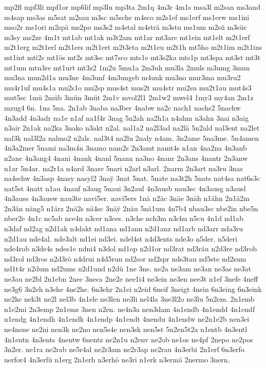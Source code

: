 {mp2fl
mpf3li
mpf1or
mp6lif
mp3lu
mp3ta
2m1q
4m3r
4m1s
msa3l
m2san
ms3and
m4sap
ms3as
m5sat
m2sau
m3sc
m5sche
m4sco
m2s1ef
ms1erf
ms1erw
ms1ini
mso2r
ms1ori
m2spä
ms2po
ms3s2
m4stal
m4strä
m3stu
ms1um
m2sü
m3süc
m3sy
ms2ze
4m1t
mt1ab
mt1ak
m3t2am
mt1ar
mt3are
mt1ein
mt1elt
m2t1erf
m2t1erg
m2t1erl
m2t1ers
m2t1ert
m2t3eta
m2t1eu
m2t1h
mt5ho
m2t1im
m2t1ins
mt1int
mti2s
mt1ös
mt2s
mt3sc
mt7sco
mts1e
mt3s2ka
mts1p
mt3spa
mt3st
mt3t
mt1um
mtu3re
mt1urt
mt3z2
1m2u
5mu1a
2m3uh
mu3la
2muls
m3umg
3mun
mu3na
mun2d1a
mu3ne
4m3unf
4m3ungeb
m4unk
mu3no
mur3ma
mu3ru2
mu4r1uf
mu4s1a
mu2s1o
mu2sp
mus4st
mus2t
mu4str
mu2su
mu2t1au
mut4s3
mut5sc
1mü
2müb
3mün
3müt
2m1v
mvol2l1
2m1w2
mwel4
1my3
my4an
2m1z
mzug4
6n.
1na
5na.
2n1ab
3naba
na3ber
4nabw
na2c
nach1
nachs2
5nachw
4n3add
4n3adr
na1e
n1af
na1f4r
3nag
5n2ah
na2h1a
n4ahm
n3ahn
3nai
n3aig
n3air
2n1ak
na2ka
3nako
n3akt
n2al.
nal1a2
na2l3ad
na2lä
5n2ald
nal3ent
na2let
nal3k
nal3l2a
nalmo2
n2als.
nal3t4
na2lu
2naly
n4am.
3n2ame
5na3me.
5n4amen
4n3a2mer
5nami
na3m4n
3namo
nam2s
2n3amt
namt4s
n1an
4na2na
4n3anb
n2anc
4n3ang4
4nani
4nank
4nanl
5nann
na3no
4nanr
2n3ans
4nantr
2n3anw
n1ar
5n4ar.
na2r1a
n4ard
3nare
5nari
n2arl
n3arl.
2narm
2n3art
na3ru
3nas
na4schw
4n3asp
4nasy
nasyl2
3na^^ff
3nat
5nat.
5nate
na3t2h
5nats
nat4sa
nat6s3c
nat5st
4natt
n1au
4nauf
n3aug
5naui
3n2aul
4n3ausb
nau3sc
4n3ausg
n3ausl
4n3auss
4n3ausw
nau3te
navi5er.
navi5ers
1nä
n2äc
3näe
3näh
n1ähn
2n1ä2m
2n3än
näng5
n1ärz
2nä2s
nä4sc
3nä^^ff
2näu
5nä1um
4n7b4
nbau3sc
nbe2in
nbe5n
nber2e
4n1c
nc5ab
nce4n
n3cer
n3ces.
n3che
nch3m
n3chu
n5cu
4n1d
nd1ab
n3daf
nd2ag
n2d1ak
n4dakt
nd1ana
nd1ann
n2d1anz
nd1arb
nd3arr
nda3ru
n2d1au
nde4al.
nde3alt
nd1ei
nd3ei.
ndel4st
n4d3ents
nde3o
n5der.
n5deri
nde4rob
n3de4s
ndes1e
ndni4
n3dol
nd1op
n2d1or
nd3rat
nd3räu
n2d3re
nd3rob
nd3rol
nd3ros
n2d3rö
n4drui
n4d5run
nd2sor
nd2spr
nds3tau
nd5ste
nd2sum
nd1t4r
n2dum
nd2ums
n2d1und
n2dü
1ne
3ne.
ne2a
ne3am
ne3an
ne3as
ne3at
ne3au
ne2bl
2n1ebn
2nec
3neca
2ne2e
nee1i4
ne3ein
ne3en
nee3t
n1ef
3nefe
4neff
ne3g6
3n2eh
n3ehe
4ne2he.
6n3ehr
2n1ei
n2eid
6neif
3neigt
4nein
6n3eing
6n3eink
ne2ke
nek3t
ne2l
nel3b
4n1ele
ne3len
ne3li
nel4la
3ne3l2o
ne3lu
5n2em.
2n1emb
n1e2mi
2n3emp
2n1ems
3nen
n2en.
ne4n3a
nen3dam
4n1endb
4n1endd
4n1endf
n1endg
4n1endh
4n1endk
4n1endp
4n1endt
4nendu
4n1endw
ne2n1e2b
nen3ei
ne4nene
ne2ni
nen3k
ne2no
nen5s4e
nen3sk
nen5st
5n2en5t2a
n1entb
4n3entl
4n1entn
4n3ents
4nentw
6nentz
ne2n1u
n2env
ne2ob
ne1os
ne4pf
2nepo
ne2pos
3n2er.
ne1ra
ne2rab
ne5r4al
ne2r3am
ne2r3ap
ne2rau
4n3erbi
2n1erf
6n3erfo
nerfor4
4n3erfü
n1erg
2n1erh
n3erhö
ne3ri
n1erk
n3ermä
2nermo
3nern.
}
